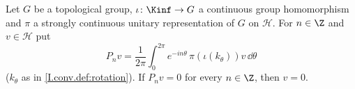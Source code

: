 Let $G$ be a topological group, $\iota\colon\Kinf\to G$ a continuous group homomorphism and $\pi$ a strongly continuous
unitary representation of $G$ on $\mathcal H$. For $n\in\Z$ and $v\in\mathcal H$ put
\[
  P_nv=\frac1{2\pi}\int_0^{2\pi}e^{-in\theta}\,\pi(\iota(k_\theta))v\,\dd\theta
\]
($k_\theta$ as in \cref{I.conv.def:rotation}). If $P_nv=0$ for every $n\in\Z$, then $v=0$.
